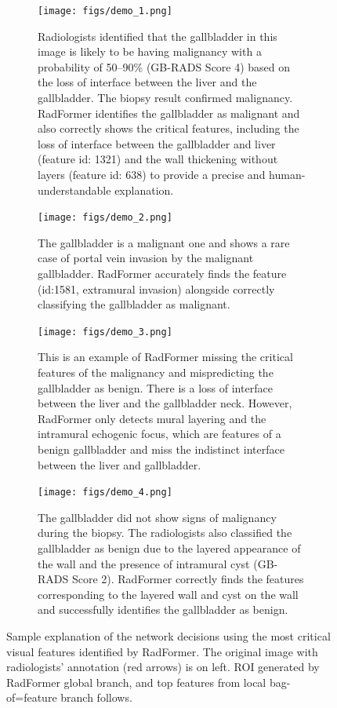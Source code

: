 \documentclass[twocolumn,final]{elsarticle}
\def\myarch{RadFormer\xspace}
\begin{document}
\begin{figure}
    \centering
    \begin{subfigure}[b]{0.9\textwidth}
		\centering
		\texttt{[image: figs/demo\_1.png]}
		\caption{ Radiologists identified that the gallbladder in this image is likely to be having malignancy with a probability of 50--90\% (GB-RADS Score 4) based on the loss of interface between the liver and the gallbladder. The biopsy result confirmed malignancy. \myarch identifies the gallbladder as malignant and also correctly shows the critical features, including the loss of interface between the gallbladder and liver (feature id: 1321) and the wall thickening without layers (feature id: 638) to provide a precise and human-understandable explanation. }
	\end{subfigure}
    \begin{subfigure}[b]{0.9\textwidth}
		\centering
		\texttt{[image: figs/demo\_2.png]}
		\caption{The gallbladder is a malignant one and shows a rare case of portal vein invasion by the malignant gallbladder.  \myarch accurately finds the feature (id:1581, extramural invasion) alongside correctly classifying the gallbladder as malignant.}
	\end{subfigure}
    \begin{subfigure}[b]{0.9\textwidth}
		\centering
		\texttt{[image: figs/demo\_3.png]}
		\caption{This is an example of \myarch missing the critical features of the malignancy and mispredicting the gallbladder as benign. There is a loss of interface between the liver and the gallbladder neck. However, \myarch only detects mural layering and the intramural echogenic focus, which are features of a benign gallbladder and miss the indistinct interface between the liver and gallbladder.}
	\end{subfigure}
	\begin{subfigure}[b]{0.9\textwidth}
		\centering
		\texttt{[image: figs/demo\_4.png]}
		\caption{The gallbladder did not show signs of malignancy during the biopsy. The radiologists also classified the gallbladder as benign due to the layered appearance of the wall and the presence of intramural cyst (GB-RADS Score 2). \myarch correctly finds the features corresponding to the layered wall and cyst on the wall and successfully identifies the gallbladder as benign.}
	\end{subfigure}
    \caption{Sample explanation of the network decisions using the most critical visual features identified by \myarch. The original image with radiologists' annotation (red arrows) is on left. ROI generated by \myarch global branch, and top features from local bag-of=feature branch follows.}
    \label{fig:radform_expl}
\end{figure}
\end{document}
